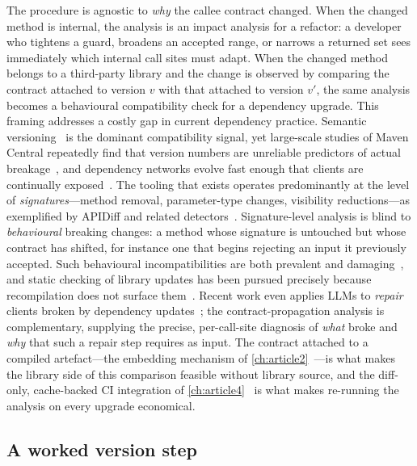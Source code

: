 The procedure is agnostic to \emph{why} the callee contract changed. When the changed method is internal, the analysis is an impact analysis for a refactor: a developer who tightens a guard, broadens an accepted range, or narrows a returned set sees immediately which internal call sites must adapt. When the changed method belongs to a third-party library and the change is observed by comparing the contract attached to version $v$ with that attached to version $v'$, the same analysis becomes a behavioural compatibility check for a dependency upgrade. This framing addresses a costly gap in current dependency practice. Semantic versioning~\cite{preston2013semver} is the dominant compatibility signal, yet large-scale studies of Maven Central repeatedly find that version numbers are unreliable predictors of actual breakage~\cite{raemaekers2017semver,ochoa2022breaking}, and dependency networks evolve fast enough that clients are continually exposed~\cite{decan2019empirical}. The tooling that exists operates predominantly at the level of \emph{signatures}---method removal, parameter-type changes, visibility reductions---as exemplified by APIDiff and related detectors~\cite{brito2018apidiff,jezek2017magic}. Signature-level analysis is blind to \emph{behavioural} breaking changes: a method whose signature is untouched but whose contract has shifted, for instance one that begins rejecting an input it previously accepted. Such behavioural incompatibilities are both prevalent and damaging~\cite{mostafa2017behavioral,jayasuriya2024understanding}, and static checking of library updates has been pursued precisely because recompilation does not surface them~\cite{foo2018efficient}. Recent work even applies LLMs to \emph{repair} clients broken by dependency updates~\cite{islam2025byam}; the contract-propagation analysis is complementary, supplying the precise, per-call-site diagnosis of \emph{what} broke and \emph{why} that such a repair step requires as input. The contract attached to a compiled artefact---the embedding mechanism of \cref{ch:article2}~\cite{edmonds_article2}---is what makes the library side of this comparison feasible without library source, and the diff-only, cache-backed CI integration of \cref{ch:article4}~\cite{edmonds_article4} is what makes re-running the analysis on every upgrade economical.

\subsection{A worked version step}\label{subsec:a5-worked}

